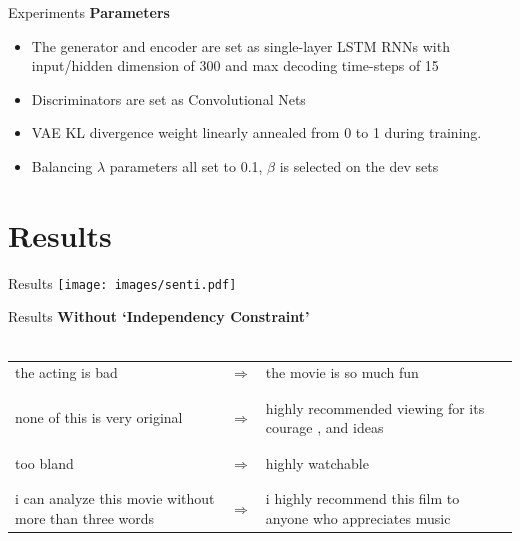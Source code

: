 \documentclass{beamer}
\begin{document}
\begin{frame}{Experiments}
  \textbf{Parameters}
  \begin{itemize}
    \item The generator and encoder are set as single-layer LSTM RNNs with input/hidden dimension of 300 and max decoding time-steps of 15
    \item Discriminators are set as Convolutional Nets
    \item VAE KL divergence weight linearly annealed from 0 to 1 during training.
    \item Balancing $\lambda$ parameters all set to 0.1, $\beta$ is selected on the dev sets
  \end{itemize}
\end{frame}

\section{Results}
\begin{frame}{Results}
  \centering
  \texttt{[image: images/senti.pdf]}
\end{frame}

\begin{frame}{Results}
  \centering
  \textbf{Without `Independency Constraint'} \\
  \vspace{1cm} \\
  \small
  \begin{tabular}{ p{.4\linewidth} p{.05\linewidth} p{.4\linewidth} }
    the acting is bad & $\Rightarrow$ & the movie is so much fun \\ \\ 
    \hline \\
    none of this is very original & $\Rightarrow$ & highly recommended viewing for its courage , and ideas \\ \\
    \hline \\
    too bland & $\Rightarrow$ & highly watchable \\ \\
    \hline \\
    i can analyze this movie without more than three words & $\Rightarrow$ & i highly recommend this film to anyone who appreciates music
  \end{tabular}
\end{frame}
\end{document}
